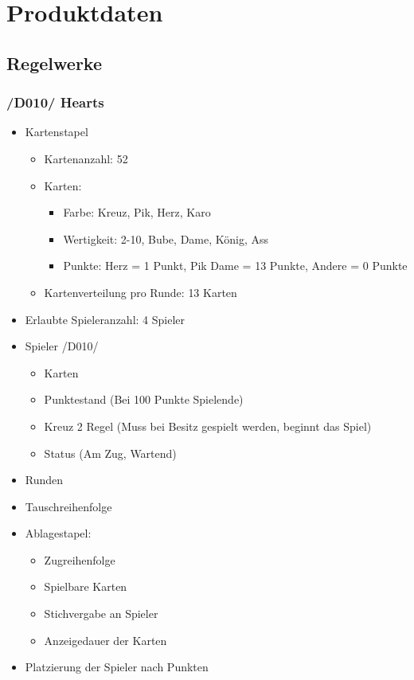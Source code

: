 \documentclass{article}
\begin{document}
\section{Produktdaten}
\subsection{\gls{Regelwerk}e}
\subsubsection{/D010/ Hearts}	
\begin{itemize}
	\item Kartenstapel
	\begin{itemize}
		\item Kartenanzahl: 52
		\item Karten:
		\begin{itemize}
			\item Farbe: Kreuz, Pik, Herz, Karo
			\item Wertigkeit: 2-10, Bube, Dame, König, Ass
			\item Punkte: Herz = 1 Punkt, Pik Dame = 13 Punkte, Andere = 0 Punkte
		\end{itemize}	
		\item Kartenverteilung pro Runde: 13 Karten				
	\end{itemize}
	\item Erlaubte Spieleranzahl: 4 Spieler		
	\item Spieler /D010/
	\begin{itemize}
		\item Karten
		\item Punktestand (Bei 100 Punkte Spielende)
		\item Kreuz 2 Regel (Muss bei Besitz gespielt werden, beginnt das Spiel)
		\item Status (Am Zug, Wartend)
	\end{itemize}
	\item Runden
	\item Tauschreihenfolge	
	\item Ablagestapel:
	\begin{itemize}
		\item Zugreihenfolge
		\item Spielbare Karten
		\item Stichvergabe an Spieler
		\item Anzeigedauer der Karten
	\end{itemize}
	\item Platzierung der Spieler nach Punkten
\end{itemize}
	
\end{document}
